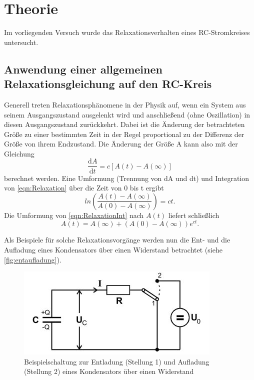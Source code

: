 \section{Theorie}
\label{sec:Theorie}
Im vorliegenden Versuch wurde das Relaxationsverhalten eines RC-Stromkreises untersucht.

\subsection{Anwendung einer allgemeinen Relaxationsgleichung auf den RC-Kreis}

Generell treten Relaxationsphänomene in der Physik auf, wenn ein System aus seinem Ausgangszustand ausgelenkt wird und anschließend (ohne Oszillation) in diesen Ausgangszustand zurückkehrt. Dabei ist die Änderung der betrachteten Größe zu einer bestimmten Zeit in der Regel proportional zu der Differenz der Größe von ihrem Endzustand. Die Änderung der Größe A kann also mit der Gleichung
\begin{equation}
    \frac{\text{d}A}{\text{d}t} = c \left[A(t) - A(\infty) \right]
    \label{eqn:Relaxation}
\end{equation}
berechnet werden. Eine Umformung (Trennung von dA und dt) und Integration von \autoref{eqn:Relaxation} über die Zeit von 0 bis t ergibt
\begin{equation}
    ln(\frac{A(t) - A(\infty)}{A(0) - A(\infty)}) = c t \text{.}
    \label{eqn:RelaxationInt}
\end{equation}
Die Umformung von \autoref{eqn:RelaxationInt} nach $A(t)$ liefert schließlich 
\begin{equation}
    A(t)= A(\infty)+(A(0) - A(\infty)) e^{c t} \text{.}
    \label{eqn:Auslenkung}
\end{equation}

Als Beispiele für solche Relaxationsvorgänge werden nun die Ent- und die Aufladung eines Kondensators über einen Widerstand betrachtet (siehe \autoref{fig:entaufladung}).
\begin{figure}
    \centering
    \includegraphics{images/entaufladung.JPG}
    \caption{Beispielschaltung zur Entladung (Stellung 1) und Aufladung (Stellung 2) eines Kondensators über einen Widerstand \cite{VA}}
    \label{fig:entaufladung}
\end{figure}


